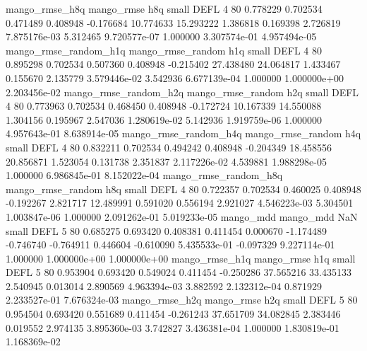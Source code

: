       mango_rmse_h8q        mango_rmse                  h8q      small     DEFL                 4 80 0.778229       0.702534 0.471489       0.408948   -0.176684     10.774633     15.293222     1.386818       0.169398  2.726819 7.875176e-03     5.312465   9.720577e-07            1.000000    3.307574e-01        4.957494e-05
mango_rmse_random_h1q mango_rmse_random                  h1q      small     DEFL                 4 80 0.895298       0.702534 0.507360       0.408948   -0.215402     27.438480     24.064817     1.433467       0.155670  2.135779 3.579446e-02     3.542936   6.677139e-04            1.000000    1.000000e+00        2.203456e-02
mango_rmse_random_h2q mango_rmse_random                  h2q      small     DEFL                 4 80 0.773963       0.702534 0.468450       0.408948   -0.172724     10.167339     14.550088     1.304156       0.195967  2.547036 1.280619e-02     5.142936   1.919759e-06            1.000000    4.957643e-01        8.638914e-05
mango_rmse_random_h4q mango_rmse_random                  h4q      small     DEFL                 4 80 0.832211       0.702534 0.494242       0.408948   -0.204349     18.458556     20.856871     1.523054       0.131738  2.351837 2.117226e-02     4.539881   1.988298e-05            1.000000    6.986845e-01        8.152022e-04
mango_rmse_random_h8q mango_rmse_random                  h8q      small     DEFL                 4 80 0.722357       0.702534 0.460025       0.408948   -0.192267      2.821717     12.489991     0.591020       0.556194  2.921027 4.546223e-03     5.304501   1.003847e-06            1.000000    2.091262e-01        5.019233e-05
            mango_mdd         mango_mdd                  NaN      small     DEFL                 5 80 0.685275       0.693420 0.408381       0.411454    0.000670     -1.174489     -0.746740    -0.764911       0.446604 -0.610090 5.435533e-01    -0.097329   9.227114e-01            1.000000    1.000000e+00        1.000000e+00
       mango_rmse_h1q        mango_rmse                  h1q      small     DEFL                 5 80 0.953904       0.693420 0.549024       0.411454   -0.250286     37.565216     33.435133     2.540945       0.013014  2.890569 4.963394e-03     3.882592   2.132312e-04            0.871929    2.233527e-01        7.676324e-03
       mango_rmse_h2q        mango_rmse                  h2q      small     DEFL                 5 80 0.954504       0.693420 0.551689       0.411454   -0.261243     37.651709     34.082845     2.383446       0.019552  2.974135 3.895360e-03     3.742827   3.436381e-04            1.000000    1.830819e-01        1.168369e-02
